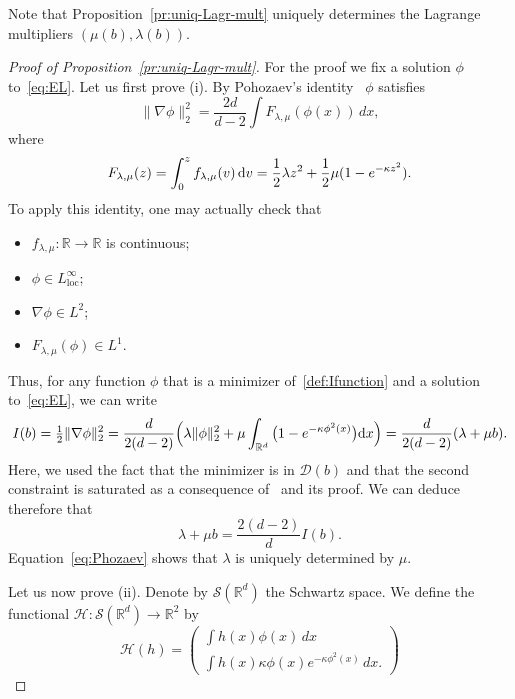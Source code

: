 \documentclass[a4paper,11pt]{amsart}
\numberwithin{equation}{section}
\newcommand{\bbR}{{\ensuremath{\mathbb R}} }
\newcommand{\cD}{{\ensuremath{\mathcal D}} }
\newcommand{\cH}{{\ensuremath{\mathcal H}} }
\newcommand{\cS}{{\ensuremath{\mathcal S}} }
\newcommand{\gk}{\kappa}
\newcommand{\gl}{\lambda}
\newcommand{\dd}{\text{\rm d}}             %
\newcommand{\R}{\mathbb{R}}
\newcommand{\8}{\infty}
\newcommand{\loc}{\mathrm{loc}}
\begin{document}
Note that Proposition~\ref{pr:uniq-Lagr-mult} uniquely determines the Lagrange multipliers $(\mu(b),\lambda(b))$.
%
\begin{proof}[Proof of Proposition~\ref{pr:uniq-Lagr-mult}]
	For the proof we fix a solution $\phi$ to~\eqref{eq:EL}. Let us first prove (i). By Pohozaev's identity~\cite[Proposition 1, Chapter 2]{BL83} $\phi$ satisfies
	\begin{equation}
	\|\nabla \phi\|_2^2 = \frac{2d}{d-2}\int F_{\gl,\mu}(\phi(x))\, dx,
	\end{equation}
	where
	\begin{equation}
	F_{\gl,\mu}(z)= \int_0^z f_{\gl,\mu}(v)\, \dd v 
	= \frac12 \gl z^2 + \frac12 \mu (1-e^{-\gk z^2}).
	\end{equation}
	To apply this identity, one may actually check that
	\begin{itemize}
		\item $f_{\gl,\mu}\colon \bbR\to\bbR$ is continuous;
		\item $\phi\in L^\infty_{\loc}$;
		\item $\nabla \phi \in L^2$;
		\item $F_{\gl,\mu}(\phi)\in L^1$.
	\end{itemize}
	Thus, for any function $\phi$ that is a minimizer of~\eqref{def:Ifunction} and a solution to~\eqref{eq:EL}, we can write
	\begin{equation}
	I(b)= \tfrac12\|\nabla \phi\|_2^2= \frac{d}{2 (d-2)}\Big(\gl \|\phi\|_2^2 + \mu \int_{\R^d}\big(1-e^{-\gk\phi^2(x)}\big) \dd x\Big)=
	\frac{d}{2 (d-2)}(\gl +\mu b).
	\end{equation}
	Here, we used the fact that the minimizer is in $\cD(b)$ and that the second constraint is saturated as a consequence of~\cite[Lemma 12]{BBH2001} and its proof. We can deduce therefore that
	\begin{equation}\label{eq:Phozaev}
	\lambda +\mu b= \frac{2 (d-2)}{d}I(b).
	\end{equation}
	Equation~\eqref{eq:Phozaev} shows that $\lambda$ is uniquely determined by $\mu$.\\
%
	\par Let us now prove (ii). Denote by $\cS(\R^d)$ the Schwartz space. We define the functional $\cH:\cS(\R^d)\to\R^2$ by
	\begin{equation}
	\cH(h) = \begin{pmatrix}
	\int h(x)\phi(x)\, dx\\
	\int h(x) \gk\phi(x) e^{-\gk \phi^2(x)}\, dx.
	\end{pmatrix}

\end{equation}
\end{proof}
\end{document}
